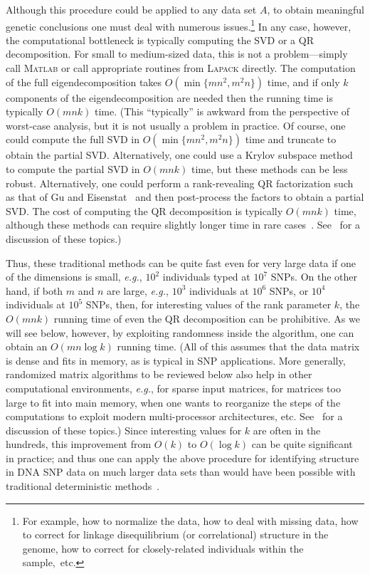 \documentclass[twoside]{article}
\begin{document}
Although this procedure could be applied to any data set $A$, to obtain 
meaningful genetic conclusions one must deal with numerous issues.\footnote{For example, how to normalize the data, how to deal with missing 
data, how to correct for linkage disequilibrium (or correlational) structure 
in the genome, how to correct for closely-related individuals within the 
sample,~etc.}
In any case, however, the computational bottleneck is typically computing 
the SVD or a QR decomposition.
For small to medium-sized data, this is not a problem---simply call
\textsc{Matlab} or call appropriate routines from \textsc{Lapack} directly.
The computation of the full eigendecomposition takes 
$O(\min\{mn^2,m^2n\})$ time, and if only $k$ components of the 
eigendecomposition are needed then the running time is typically $O(mnk)$ time.
(This ``typically'' is awkward from the perspective of worst-case
analysis, but it is not usually a problem in practice.  Of course, one could
compute the full SVD in $O(\min\{mn^2,m^2n\})$ time and truncate to obtain 
the partial SVD.  Alternatively, one could use a Krylov subspace method to 
compute the partial SVD in $O(mnk)$ time, but these methods can be less 
robust.  Alternatively, one could perform a rank-revealing QR factorization
such as that of Gu and Eisenstat~\cite{GE96} and then post-process the 
factors to obtain a partial SVD.  The cost of computing the QR decomposition 
is typically $O(mnk)$ time, although these methods can require slightly 
longer time in rare cases~\cite{GE96}.  See~\cite{HMT09_SIREV} for a discussion of 
these topics.)

Thus, these traditional methods can be quite fast even for very large data 
if one of the dimensions is small, \emph{e.g.}, $10^2$ individuals typed at 
$10^7$ SNPs.
On the other hand, if both $m$ and $n$ are large, \emph{e.g.}, $10^3$ 
individuals at $10^6$ SNPs, or $10^4$ individuals at $10^5$ SNPs, then, for
interesting values of the rank parameter $k$, the $O(mnk)$ running time of 
even the QR decomposition can be prohibitive.
As we will see below, however, by exploiting randomness inside the 
algorithm, one can obtain an $O(mn \log k)$ running time.
(All of this assumes that the data matrix is dense and fits in 
memory, as is typical in SNP applications.  More generally, randomized 
matrix algorithms to be reviewed below also help in other computational 
environments, \emph{e.g.}, for sparse input matrices, for matrices too large 
to fit into main memory, when one wants to reorganize the steps of the 
computations to exploit modern multi-processor architectures, etc.  
See~\cite{HMT09_SIREV} for a discussion of these topics.)
Since interesting values for $k$ are often in the hundreds, this improvement
from $O(k)$ to $O(\log k)$ can be quite significant in practice;
and thus one can apply the above procedure for identifying structure in 
DNA SNP data on much larger data sets than would have been possible with 
traditional deterministic methods~\cite{Sayan11-unpub}.
\end{document}
